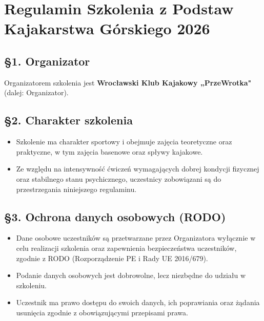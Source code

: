 \section{Regulamin Szkolenia z Podstaw Kajakarstwa Górskiego 2026}

\subsection*{§1. Organizator}

Organizatorem szkolenia jest \textbf{Wrocławski Klub Kajakowy „PrzeWrotka"} (dalej:
Organizator).

\subsection*{§2. Charakter szkolenia}

\begin{itemize}[leftmargin=1.5em, itemsep=2pt]
  \item Szkolenie ma charakter sportowy i obejmuje zajęcia teoretyczne oraz praktyczne,
    w tym zajęcia basenowe oraz spływy kajakowe.
  \item Ze względu na intensywność ćwiczeń wymagających dobrej kondycji fizycznej oraz
    stabilnego stanu psychicznego, uczestnicy zobowiązani są do przestrzegania niniejszego
    regulaminu.
\end{itemize}

\subsection*{§3. Ochrona danych osobowych (RODO)}

\begin{itemize}[leftmargin=1.5em, itemsep=2pt]
  \item Dane osobowe uczestników są przetwarzane przez Organizatora wyłącznie w celu
    realizacji szkolenia oraz zapewnienia bezpieczeństwa uczestników, zgodnie z RODO
    (Rozporządzenie PE i Rady UE 2016/679).
  \item Podanie danych osobowych jest dobrowolne, lecz niezbędne do udziału w szkoleniu.
  \item Uczestnik ma prawo dostępu do swoich danych, ich poprawiania oraz żądania usunięcia
    zgodnie z obowiązującymi przepisami prawa.
\end{itemize}

